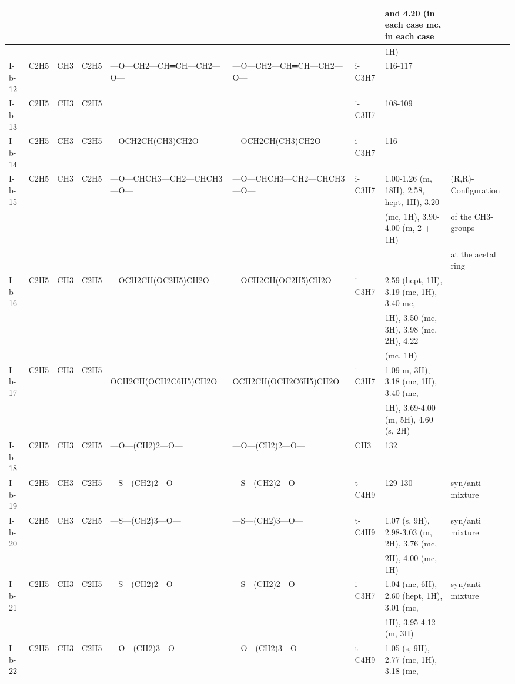 \documentclass[11pt,a4paper]{article}
\begin{document}
\begin{table}[h]
\begin{tabular}{|l|l|l|l|l|l|l|l|l|}
 &  &  &  &  &  &  & and 4.20 (in each case mc, in each case &  \\ \hline
 &  &  &  &  &  &  & 1H) &  \\ \hline
I-b-12 & C2H5 & CH3 & C2H5 & —O—CH2—CH═CH—CH2—O— & —O—CH2—CH═CH—CH2—O— & i-C3H7 & 116-117 &  \\ \hline
I-b-13 & C2H5 & CH3 & C2H5 &  &  & i-C3H7 & 108-109 &  \\ \hline
I-b-14 & C2H5 & CH3 & C2H5 & —OCH2CH(CH3)CH2O— & —OCH2CH(CH3)CH2O— & i-C3H7 & 116 &  \\ \hline
I-b-15 & C2H5 & CH3 & C2H5 & —O—CHCH3—CH2—CHCH3—O— & —O—CHCH3—CH2—CHCH3—O— & i-C3H7 & 1.00-1.26 (m, 18H), 2.58, hept, 1H), 3.20 & (R,R)-Configuration \\ \hline
 &  &  &  &  &  &  & (mc, 1H), 3.90-4.00 (m, 2 + 1H) & of the CH3-groups \\ \hline
 &  &  &  &  &  &  &  & at the acetal ring \\ \hline
I-b-16 & C2H5 & CH3 & C2H5 & —OCH2CH(OC2H5)CH2O— & —OCH2CH(OC2H5)CH2O— & i-C3H7 & 2.59 (hept, 1H), 3.19 (mc, 1H), 3.40 mc, &  \\ \hline
 &  &  &  &  &  &  & 1H), 3.50 (mc, 3H), 3.98 (mc, 2H), 4.22 &  \\ \hline
 &  &  &  &  &  &  & (mc, 1H) &  \\ \hline
I-b-17 & C2H5 & CH3 & C2H5 & —OCH2CH(OCH2C6H5)CH2O— & —OCH2CH(OCH2C6H5)CH2O— & i-C3H7 & 1.09 m, 3H), 3.18 (mc, 1H), 3.40 (mc, &  \\ \hline
 &  &  &  &  &  &  & 1H), 3.69-4.00 (m, 5H), 4.60 (s, 2H) &  \\ \hline
I-b-18 & C2H5 & CH3 & C2H5 & —O—(CH2)2—O— & —O—(CH2)2—O— & CH3 & 132 &  \\ \hline
I-b-19 & C2H5 & CH3 & C2H5 & —S—(CH2)2—O— & —S—(CH2)2—O— & t-C4H9 & 129-130 & syn/anti mixture \\ \hline
I-b-20 & C2H5 & CH3 & C2H5 & —S—(CH2)3—O— & —S—(CH2)3—O— & t-C4H9 & 1.07 (s, 9H), 2.98-3.03 (m, 2H), 3.76 (mc, & syn/anti mixture \\ \hline
 &  &  &  &  &  &  & 2H), 4.00 (mc, 1H) &  \\ \hline
I-b-21 & C2H5 & CH3 & C2H5 & —S—(CH2)2—O— & —S—(CH2)2—O— & i-C3H7 & 1.04 (mc, 6H), 2.60 (hept, 1H), 3.01 (mc, & syn/anti mixture \\ \hline
 &  &  &  &  &  &  & 1H), 3.95-4.12 (m, 3H) &  \\ \hline
I-b-22 & C2H5 & CH3 & C2H5 & —O—(CH2)3—O— & —O—(CH2)3—O— & t-C4H9 & 1.05 (s, 9H), 2.77 (mc, 1H), 3.18 (mc, &  \\ \hline

\end{tabular}
\end{table}
\end{document}
